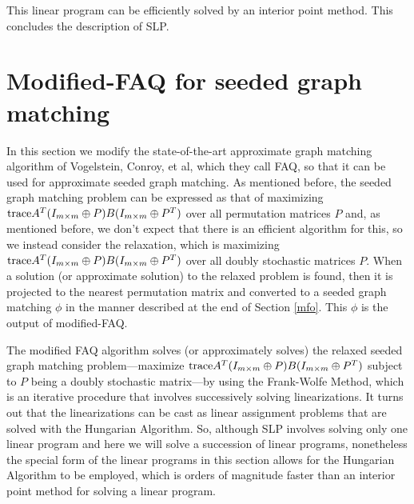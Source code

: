 \documentclass[12pt]{article}
\newcommand{\tr}{\textup{trace}}
\begin{document}
This linear program can be efficiently solved by an interior point method. This
concludes the description of SLP.



\section{Modified-FAQ for seeded graph matching \label{mfaq}}

In this section we modify the state-of-the-art approximate graph matching
algorithm of Vogelstein, Conroy, et al, which they call FAQ, so that it can
be used for approximate seeded graph matching. As mentioned before, the
seeded graph matching problem
can be expressed as that of maximizing
$\tr A^T(I_{m \times m}\oplus P)B(I_{m \times m}\oplus P^T)$
over all permutation matrices $P$ and, as mentioned before,
we don't expect that there is an efficient algorithm for this,
so we instead consider the relaxation,
which is maximizing $\tr A^T(I_{m \times m}\oplus P)B(I_{m \times m}\oplus P^T)$
over all doubly stochastic matrices $P$.
When a solution (or approximate solution) to the relaxed problem is found,
then it is projected to the nearest permutation matrix and converted 
to a seeded graph matching $\phi$
in the manner described at the end of Section \ref{mfo}.
 This $\phi$ is the output of modified-FAQ.


The modified FAQ algorithm solves (or approximately
solves) the relaxed seeded graph matching problem---maximize
$\tr A^T(I_{m \times m}\oplus P)B(I_{m \times m}\oplus P^T)$
subject to $P$ being a doubly stochastic matrix---by using the
Frank-Wolfe Method, which is an iterative procedure that
involves successively solving linearizations. It turns out that the
linearizations can be cast as linear assignment problems
that are solved with the Hungarian Algorithm. So, although SLP
involves solving only one linear program and here we will solve
a succession of linear programs, nonetheless the special form of
the linear programs in this section allows for the Hungarian Algorithm
to be employed, which is orders of magnitude faster than  an
interior point method for solving a linear program.
\end{document}
